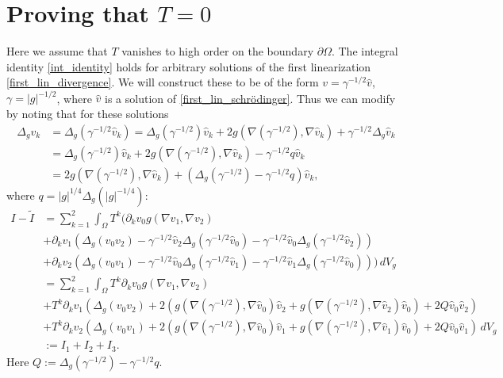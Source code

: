 \documentclass[a4paper, 10pt, twoside, notitlepage]{amsart}
\theoremstyle{plain}
\newcommand{\Om}{\Omega}
\numberwithin{equation}{section}
\newcommand {\p} {\partial}
\newcommand{\abs}[1]{\lvert #1 \rvert}
\begin{document}
\section{Proving that $T=0$}\label{sec_T=0}

Here we assume that $T$ vanishes to high order on the boundary $\p\Om$. The integral identity \eqref{int_identity} holds for arbitrary solutions of the first linearization \eqref{first_lin_divergence}. We will construct these to be of the form $v=\gamma^{-1/2}\hat{v}$, $\gamma=\abs{g}^{-1/2}$, where $\hat{v}$ is a solution of \eqref{first_lin_schrödinger}. Thus we can modify by noting that for these solutions 
\begin{align*}
	\Delta_g v_k &= \Delta_g(\gamma^{-1/2}\hat{v}_k) = \Delta_g(\gamma^{-1/2})\hat{v}_k + 2g\left(\nabla(\gamma^{-1/2}),\nabla \hat{v}_k\right) + \gamma^{-1/2}\Delta_g\hat{v}_k\\
	&= \Delta_g(\gamma^{-1/2})\hat{v}_k + 2g\left(\nabla(\gamma^{-1/2}),\nabla \hat{v}_k\right) - \gamma^{-1/2}q\hat{v}_k\\
	&= 2g\left(\nabla(\gamma^{-1/2}),\nabla \hat{v}_k\right) + \left(\Delta_g(\gamma^{-1/2}) - \gamma^{-1/2}q\right)\hat{v}_k,
\end{align*}
where $q=\abs{g}^{1/4}\Delta_g(\abs{g}^{-1/4})$:
\begin{align*}
	I-\tilde I &= \sum_{k=1}^{2}\int_{\Om}T^k\Big( \p_kv_0g(\nabla v_1, \nabla v_2) \\
	&+ \p_kv_1(\Delta_g(v_0v_2) - \gamma^{-1/2}\hat{v}_2\Delta_g(\gamma^{-1/2}\hat{v}_0) - \gamma^{-1/2}\hat{v}_0\Delta_g(\gamma^{-1/2}\hat{v}_2))\\
	&+ \p_kv_2(\Delta_g(v_0v_1) - \gamma^{-1/2}\hat{v}_0\Delta_g(\gamma^{-1/2}\hat{v}_1) - \gamma^{-1/2}\hat{v}_1\Delta_g(\gamma^{-1/2}\hat{v}_0))\Big)\,dV_g\\
	&= \sum_{k=1}^{2} \int_{\Om} T^k\p_kv_0g(\nabla v_1, \nabla v_2) \\
	&+ T^k\p_kv_1\left(\Delta_g(v_0v_2) + 2\left(g\left(\nabla(\gamma^{-1/2}),\nabla \hat{v}_0\right)\hat{v}_2 + g\left(\nabla(\gamma^{-1/2}),\nabla \hat{v}_2\right)\hat{v}_0\right) + 2Q\hat{v}_0\hat{v}_2\right)\\
	&+ T^k\p_kv_2\left(\Delta_g(v_0v_1) + 2\left(g\left(\nabla(\gamma^{-1/2}),\nabla \hat{v}_0\right)\hat{v}_1 + g\left(\nabla(\gamma^{-1/2}),\nabla \hat{v}_1\right)\hat{v}_0\right) + 2Q\hat{v}_0\hat{v}_1\right)\,dV_g\\
	&:= I_1 + I_2 + I_3.
\end{align*}
Here $Q:=\Delta_g(\gamma^{-1/2}) - \gamma^{-1/2}q$.
\end{document}
